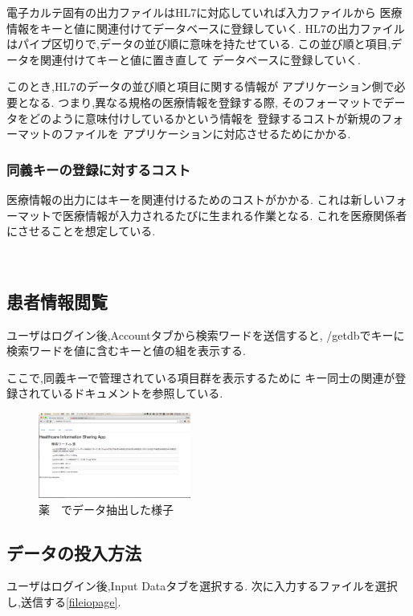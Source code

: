 	電子カルテ固有の出力ファイルはHL7に対応していれば入力ファイルから
	医療情報をキーと値に関連付けてデータベースに登録していく.
	HL7の出力ファイルはパイプ区切りで,データの並び順に意味を持たせている.
	この並び順と項目,データを関連付けてキーと値に置き直して
	データベースに登録していく.

	このとき,HL7のデータの並び順と項目に関する情報が
	アプリケーション側で必要となる.
	つまり,異なる規格の医療情報を登録する際,
	そのフォーマットでデータをどのように意味付けしているかという情報を
	登録するコストが新規のフォーマットのファイルを
	アプリケーションに対応させるためにかかる.


	\subsubsection{同義キーの登録に対するコスト}
	医療情報の出力にはキーを関連付けるためのコストがかかる.
	これは新しいフォーマットで医療情報が入力されるたびに生まれる作業となる.
	これを医療関係者にさせることを想定している.



\subsection{患者情報閲覧}
	ユーザはログイン後,Accountタブから検索ワードを送信すると,
	/getdbでキーに検索ワードを値に含むキーと値の組を表示する.

	ここで,同義キーで管理されている項目群を表示するために
	キー同士の関連が登録されているドキュメントを参照している.



		\begin{figure}[htbp]
				\includegraphics[width=5cm, bb=0 0 437 688]{./gazou/getdb.png}
			\caption{薬　でデータ抽出した様子}
			\label{ss-mix_sampledata}
		\end{figure}



\subsection{データの投入方法}
	ユーザはログイン後,Input Dataタブを選択する.
	次に入力するファイルを選択し,送信する\ref{fileiopage}.

